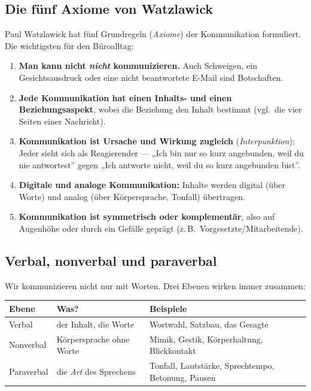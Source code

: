 \documentclass[11pt, a4paper]{article}
\begin{document}
\subsection{Die fünf Axiome von Watzlawick}

Paul Watzlawick hat fünf Grundregeln (\emph{Axiome}) der Kommunikation formuliert. Die
wichtigsten für den Büroalltag:

\begin{enumerate}
  \item \textbf{Man kann nicht \emph{nicht} kommunizieren.} Auch Schweigen, ein
    Gesichtsausdruck oder eine nicht beantwortete E-Mail sind Botschaften.
  \item \textbf{Jede Kommunikation hat einen Inhalts- und einen Beziehungsaspekt}, wobei
    die Beziehung den Inhalt bestimmt (vgl.\ die vier Seiten einer Nachricht).
  \item \textbf{Kommunikation ist Ursache und Wirkung zugleich} (\emph{Interpunktion}):
    Jeder sieht sich als Reagierender --- „Ich bin nur so kurz angebunden, weil du nie
    antwortest” gegen „Ich antworte nicht, weil du so kurz angebunden bist”.
  \item \textbf{Digitale und analoge Kommunikation:} Inhalte werden digital (über Worte)
    und analog (über Körpersprache, Tonfall) übertragen.
  \item \textbf{Kommunikation ist symmetrisch oder komplementär}, also auf Augenhöhe oder
    durch ein Gefälle geprägt (z.\,B.\ Vorgesetzte/Mitarbeitende).
\end{enumerate}

\subsection{Verbal, nonverbal und paraverbal}

Wir kommunizieren nicht nur mit Worten. Drei Ebenen wirken immer zusammen:

\begin{center}
\begin{tabular}{p{3.2cm} p{4.2cm} p{5.2cm}}
\toprule
\textbf{Ebene} & \textbf{Was?} & \textbf{Beispiele}\\
\midrule
Verbal & der Inhalt, die Worte & Wortwahl, Satzbau, das Gesagte\\
Nonverbal & Körpersprache ohne Worte & Mimik, Gestik, Körperhaltung, Blickkontakt\\
Paraverbal & die \emph{Art} des Sprechens & Tonfall, Lautstärke, Sprechtempo, Betonung, Pausen\\
\bottomrule
\end{tabular}
\end{center}
\end{document}

